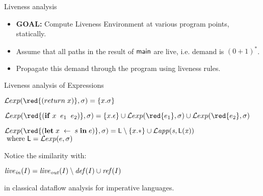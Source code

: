 \documentclass[xcolor=x11names,compress,mathserif]{beamer}
\renewcommand{\(}{\begin{columns}}
\renewcommand{\)}{\end{columns}}
\newcommand{\<}[1]{\begin{column}{#1}}
\renewcommand{\>}{\end{column}}
\begin{document}

\begin{frame}{Liveness analysis}
  \begin{itemize}
  \item {\bf  GOAL:} Compute  Liveness Environment at  various program
    points, statically. 
  \item Assume that all paths in the result of ${\sf main}$ are live, i.e. demand is $(0 + 1)^*$.
  \item Propagate this demand through the program using liveness rules.
  \end{itemize}
\end{frame}

\begin{frame}{Liveness analysis of Expressions}

\normalsize
$\Lexp{{\red{(return\; x)}}}{\sigma} = \{x.\sigma\}$


\bigskip
\medskip

  $\Lexp{{\red{(\SIF \; x\;\;  e_1\; \; e_2)}}}{\sigma} = \{x.\epsilon\} 
 \cup \Lexp{{\red{ e_1}}}{\sigma} \cup \Lexp{{\red{e_2}}}{\sigma}$



\bigskip
\medskip

$  \Lexp{{\red{(\LET \; x\; \leftarrow \; s \; \IN \; e)}}}{\sigma} = \Lv
           \setminus \{x.*\}
           \cup \mathit{\Lapp{s}{\Lv(x)}}$\\
\hspace*{4.5cm} $ \mbox{ where } \mathsf{L} = \mathcal{L}exp(e,\sigma)$

\bigskip

\pause
Notice the similarity with:
\bigskip

\centerline{$\mathit{live}_\mathit{in}(I)      =     \mathit{live}_\mathit{out}(I)
\setminus \mathit{def\/}(I) \cup \mathit{ref\/}(I)$}
\bigskip

in classical dataflow analysis for imperative languages.
\end{frame}
\end{document}
